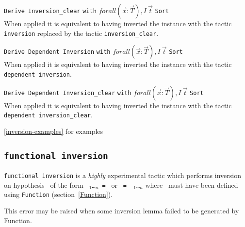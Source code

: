 \begin{Variants}
\item \texttt{Derive Inversion\_clear} {\ident} \texttt{with}
  $forall (\vec{x}:\vec{T}), I~\vec{t}$ \texttt{Sort} \sort~ \\ 
  When applied it is equivalent to having
  inverted the instance with the tactic \texttt{inversion}
  replaced by the tactic \texttt{inversion\_clear}.
\item \texttt{Derive Dependent Inversion} {\ident} \texttt{with}
  $forall (\vec{x}:\vec{T}), I~\vec{t}$ \texttt{Sort} \sort~\\
  When applied it is equivalent to having
  inverted the instance with the tactic \texttt{dependent inversion}.
\item \texttt{Derive Dependent Inversion\_clear} {\ident} \texttt{with}
  $forall (\vec{x}:\vec{T}), I~\vec{t}$ \texttt{Sort} \sort~\\
  When applied it is equivalent to having
  inverted the instance with the tactic \texttt{dependent inversion\_clear}.
\end{Variants}

\SeeAlso \ref{inversion-examples} for examples



\subsection[\tt functional inversion \ident]{\tt functional inversion \ident\label{sec:functional-inversion}}

\texttt{functional inversion} is a \emph{highly} experimental tactic
which performs inversion on hypothesis \ident\ of the form
\texttt{\qualid\ \term$_1$\dots\term$_n$\ = \term} or \texttt{\term\ =
  \qualid\ \term$_1$\dots\term$_n$} where \qualid\ must have been
defined using \texttt{Function} (section~\ref{Function}).

\begin{ErrMsgs}
\item {}
\item {}
  This error may be raised when  some inversion lemma failed to be
  generated by Function.
\end{ErrMsgs}

